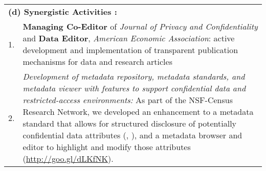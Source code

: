 \documentclass[10pt,letterpaper]{article}
\begin{document}
\begin{longtable}{lp{6.3in}}
\\
\multicolumn{2}{l}{\bf (d) Synergistic Activities :}\\
1. & \textbf{Managing Co-Editor} of {\it Journal of Privacy and Confidentiality} and \textbf{Data Editor}, {\it American Economic Association}: active development and implementation of transparent publication mechanisms for data and research articles\\

2. &{{\it Development of metadata repository, metadata standards, and metadata viewer with features to support confidential data and restricted-access environments:} As part of the NSF-Census Research Network, we developed an enhancement to a metadata standard that allows for structured disclosure of potentially confidential data attributes (\citeauthor{AbowdVilhuberBlock2012}, \citeyear{AbowdVilhuberBlock2012}), and a metadata browser and editor to highlight and modify those attributes (\href{http://goo.gl/dLKfNK}{http://goo.gl/dLKfNK}).}\\




\end{longtable}
\end{document}
